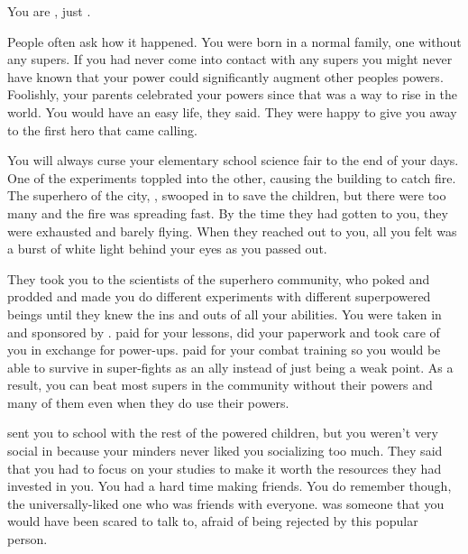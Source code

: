 \documentclass[char]{LRSguildcamp1}
\begin{document}
\name{\cYS{}}

You are \cYS{\intro}, just \cYS{}. 

People often ask how it happened. You were born in a normal family, one without any supers. If you had never come into contact with any supers you might never have known that your power could significantly augment other peoples powers. Foolishly, your parents celebrated your powers since that was a way to rise in the world. You would have an easy life, they said. They were happy to give you away to the first hero that came calling. 

You will always curse your elementary school science fair to the end of your days. One of the experiments toppled into the other, causing the building to catch fire. The superhero of the city, \cEther{}, swooped in to save the children, but there were too many and the fire was spreading fast. By the time they had gotten to you, they were exhausted and barely flying. When they reached out to you, all you felt was a burst of white light behind your eyes as you passed out. 

They took you to the scientists of the superhero community, who poked and prodded and made you do different experiments with different superpowered beings until they knew the ins and outs of all your abilities. You were taken in and sponsored by \cEther{\them}. \cEther{\they} paid for your lessons, did your paperwork and took care of you in exchange for power-ups. \cEther{\they}  paid for your combat training so you would be able to survive in super-fights as an ally instead of just being a weak point. As a result, you can beat most supers in the community without their powers and many of them even when they do use their powers. 

\cEther{\they} sent you to school with the rest of the powered children, but you weren't very social in \pSuperSchool{} because your minders never liked you socializing too much. They said that you had to focus on your studies to make it worth the resources they had invested in you. You had a hard time making friends. You do remember \cYoungest{} though, the universally-liked one who was friends with everyone. \cYoungest{} was someone that you would have been scared to talk to, afraid of being rejected by this popular person.  
\end{document}
